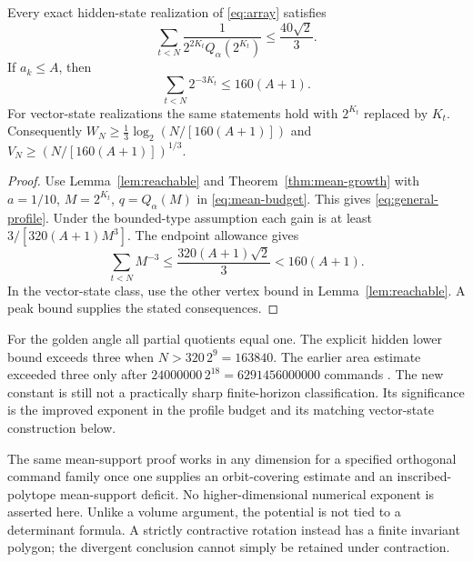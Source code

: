 \begin{theorem}
\label{thm:profiles}
Every exact hidden-state realization of \eqref{eq:array} satisfies
\begin{equation}\label{eq:general-profile}
 \sum_{t<N}\frac1{2^{2K_t}Q_\alpha(2^{K_t})}
                                           \le\frac{40\sqrt2}{3}.
\end{equation}
If $a_k\le A$, then
\begin{equation}\label{eq:bounded-profile}
              \sum_{t<N}2^{-3K_t}\le160(A+1).
\end{equation}
For vector-state realizations the same statements hold with $2^{K_t}$
replaced by $K_t$. Consequently
$W_N\ge\frac13\log_2(N/[160(A+1)])$ and
$V_N\ge(N/[160(A+1)])^{1/3}$.
\end{theorem}
\begin{proof}
Use Lemma~\ref{lem:reachable} and Theorem~\ref{thm:mean-growth} with
$a=1/10$, $M=2^{K_t}$, $q=Q_\alpha(M)$ in
\eqref{eq:mean-budget}. This gives \eqref{eq:general-profile}.
Under the bounded-type assumption each gain is at least
$3/[320(A+1)M^3]$. The endpoint allowance gives
\[
 \sum_{t<N}M^{-3}\le\frac{320(A+1)\sqrt2}{3}<160(A+1).
\]
In the vector-state class, use the other vertex bound in
Lemma~\ref{lem:reachable}. A peak bound supplies the stated consequences.
\end{proof}

For the golden angle all partial quotients equal one. The explicit hidden
lower bound exceeds three when $N>320\,2^9=163840$.
The earlier area estimate exceeded three only after
$24000000\,2^{18}=6291456000000$ commands \cite{GTF32}.
The new constant is still not a practically sharp finite-horizon
classification. Its significance is the improved exponent in the profile
budget and its matching vector-state construction below.

The same mean-support proof works in any dimension for a specified
orthogonal command family once one supplies an orbit-covering estimate
and an inscribed-polytope mean-support deficit. No higher-dimensional
numerical exponent is asserted here. Unlike a volume argument, the
potential is not tied to a determinant formula. A strictly contractive
rotation instead has a finite invariant polygon; the divergent conclusion
cannot simply be retained under contraction.
